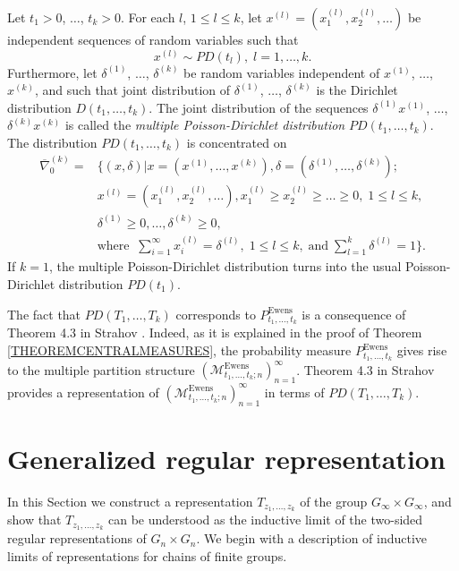 \documentclass[12pt]{amsart}
\theoremstyle{definition}
\numberwithin{equation}{section}
\DeclareMathOperator{\Ewens}{Ewens}
\begin{document}
Let $t_1>0$, $\ldots$, $t_k>0$.  For each $l$, $1\leq l\leq k$, let $x^{(l)}=\left(x^{(l)}_1,x^{(l)}_2,\ldots \right)$
be independent sequences of random variables such that
$$
x^{(l)}\sim PD(t_l),\; l=1,\ldots, k.
$$
Furthermore, let  $\delta^{(1)}$, $\ldots$, $\delta^{(k)}$ be random variables independent of $x^{(1)}$, $\ldots$, $x^{(k)}$, and such that joint distribution of
 $\delta^{(1)}$, $\ldots$, $\delta^{(k)}$ is the Dirichlet distribution $D\left(t_1,\ldots,t_k\right)$.
The joint distribution of the sequences
$\delta^{(1)}x^{(1)}$, $\ldots$, $\delta^{(k)}x^{(k)}$ is called the \textit{multiple Poisson-Dirichlet distribution}
$PD(t_1,\ldots,t_k)$.\\
The distribution $PD(t_1,\ldots,t_k)$ is concentrated on
\begin{equation}\label{GeneralizedThomaSet}
\begin{split}
\overline{\nabla}_0^{(k)}=&\biggl\{(x,\delta)\biggr|
x=\left(x^{(1)},\ldots,x^{(k)}\right),
\delta=\left(\delta^{(1)},\ldots,\delta^{(k)}\right);\\
&x^{(l)}=\left(x^{(l)}_1,x^{(l)}_2,\ldots\right),
x_1^{(l)}\geq x_2^{(l)}\geq\ldots\geq 0,\; 1\leq l\leq k,\\
&
\delta^{(1)}\geq 0,\ldots,\delta^{(k)}\geq 0,\\
&\mbox{where}\;\;\sum\limits_{i=1}^{\infty}x_i^{(l)}=\delta^{(l)},\; 1\leq l\leq k,\;\mbox{and}\;\sum\limits_{l=1}^k\delta^{(l)}=1\biggl\}.
\end{split}
\nonumber
\end{equation}
 If $k=1$, the multiple Poisson-Dirichlet distribution turns into the usual Poisson-Dirichlet distribution $PD(t_1)$.

The fact that $PD\left(T_1,\ldots, T_k\right)$ corresponds to $P_{t_1,\ldots,t_k}^{\Ewens}$ is a consequence of Theorem 4.3 in Strahov \cite{StrahovMPS}. Indeed, as it is explained in the proof of Theorem \ref{THEOREMCENTRALMEASURES}, the probability measure $P_{t_1,\ldots,t_k}^{\Ewens}$
gives rise to the multiple partition structure
$\left(\mathcal{M}_{t_1,\ldots,t_k; n}^{\Ewens}\right)_{n=1}^{\infty}$.
Theorem 4.3 in Strahov \cite{StrahovMPS} provides a representation of
$\left(\mathcal{M}_{t_1,\ldots,t_k; n}^{\Ewens}\right)_{n=1}^{\infty}$
in terms of $PD\left(T_1,\ldots, T_k\right)$.
\section{Generalized regular representation}\label{SectionGeneralizedRepresentations}
In this Section we construct a representation $T_{z_1,\ldots,z_k}$ of the group
$G_{\infty}\times G_{\infty}$, and show that $T_{z_1,\ldots,z_k}$ can be understood as the inductive limit of the two-sided regular representations
of $G_n\times G_n$.  We begin with a description of inductive limits of representations for chains of finite groups.
\end{document}
